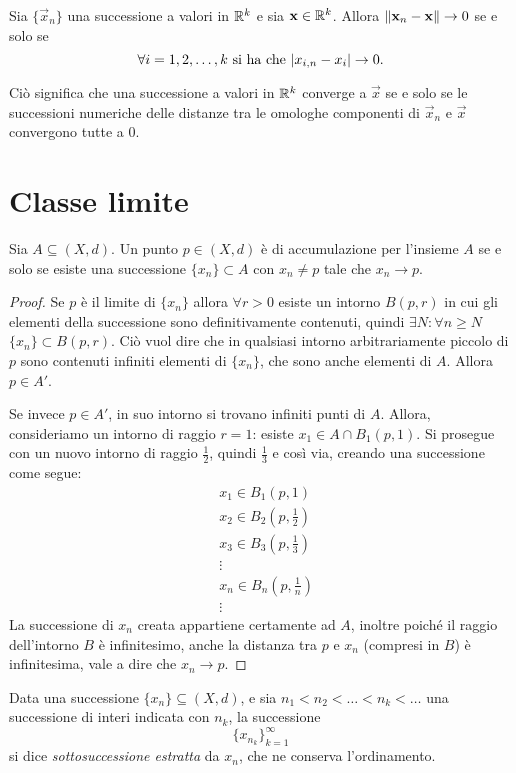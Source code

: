 \begin{teorema}
Sia $\{\vec x_n\}$ una successione a valori in $\mathbb{R}^k$ e sia $\mathbf{x}\in\mathbb{R}^k$. Allora $\lVert\mathbf{x}_n-\mathbf{x}\rVert\to 0$ se e solo se
\[
\forall i=1,2,\dots,k\text{ si ha che }\lvert x_{i,n}-x_i\rvert\to 0.
\]
\end{teorema}
Ciò significa che una successione a valori in $\mathbb{R}^k$ converge a $\vec x$ se e solo se le successioni numeriche delle distanze tra le omologhe componenti di $\vec x_n$ e $\vec x$ convergono tutte a 0.

\section{Classe limite}
\begin{lemma}
\label{l:pda_insieme}
Sia $A\subseteq (X,d)$. Un punto $p\in(X,d)$ è di accumulazione per l'insieme $A$ se e solo se esiste una successione $\{x_n\}\subset A$ con $x_n\neq p$ tale che $x_n\to p$.
\end{lemma}
\begin{proof}
Se $p$ è il limite di $\{x_n\}$ allora $\forall r>0$ esiste un intorno $B(p,r)$ in cui gli elementi della successione sono definitivamente contenuti, quindi $\exists N\colon\forall n\geq N$ $\{x_n\}\subset B(p,r)$. Ciò vuol dire che in qualsiasi intorno arbitrariamente piccolo di $p$ sono contenuti infiniti elementi di $\{x_n\}$, che sono anche elementi di $A$. Allora $p\in A'$.

Se invece $p\in A'$, in suo intorno si trovano infiniti punti di $A$. Allora, consideriamo un intorno di raggio $r=1$: esiste $x_1\in A\cap B_1(p,1)$. Si prosegue con un nuovo intorno di raggio $\frac12$, quindi $\frac13$ e così via, creando una successione come segue:
\begin{align*}
&x_1\in B_1(p,1)\\
&x_2\in B_2(p,\frac12)\\
&x_3\in B_3(p,\frac13)\\
&\vdots\\
&x_n\in B_n(p,\frac1{n})\\
&\vdots
\end{align*}
La successione di $x_n$ creata appartiene certamente ad $A$, inoltre poiché il raggio dell'intorno $B$ è infinitesimo, anche la distanza tra $p$ e $x_n$ (compresi in $B$) è infinitesima, vale a dire che $x_n\to p$.
\end{proof}
\begin{definizione}
\label{d:sottosuccessione}
Data una successione $\{x_n\}\subseteq(X,d)$, e sia $n_1<n_2<\dots<n_k<\dots$ una successione di interi indicata con $n_k$, la successione
\[
\big\{x_{n_k}\big\}_{k=1}^{\infty}
\]
si dice \emph{sottosuccessione estratta} da $x_n$, che ne conserva l'ordinamento.
\end{definizione}
